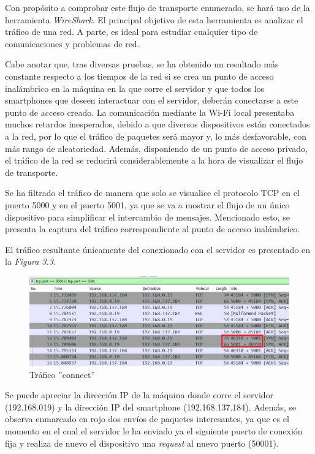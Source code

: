 \documentclass[a4paper,11pt]{book}
\begin{document}
			Con propósito a comprobar este flujo de transporte enumerado, se hará uso de la herramienta \textit{WireShark}. El principal objetivo de esta herramienta es analizar el tráfico de una red. A parte, es ideal para estudiar cualquier tipo de comunicaciones y problemas de red.
			
			Cabe anotar que, tras diversas pruebas, se ha obtenido un resultado más constante respecto a los tiempos de la red si se crea un punto de acceso inalámbrico en la máquina en la que corre el servidor y que todos los smartphones que deseen interactuar con el servidor, deberán conectarse a este punto de acceso creado. La comunicación mediante la Wi-Fi local presentaba muchos retardos inesperados, debido a que diversos dispositivos están conectados a la red, por lo que el tráfico de paquetes será mayor y, lo más desfavorable, con más rango de aleatoriedad.
			Además, disponiendo de un punto de acceso privado, el tráfico de la red se reducirá considerablemente a la hora de visualizar el flujo de transporte.
			
			Se ha filtrado el tráfico de manera que solo se visualice el protocolo TCP en el puerto 5000 y en el puerto 5001, ya que se va a mostrar el flujo de un único dispositivo  para simplificar el intercambio de mensajes. Mencionado esto, se presenta la captura del tráfico correspondiente al punto de acceso inalámbrico. 
			
			El tráfico resultante únicamente del conexionado con el servidor es presentado en la \textit{Figura 3.3}.
			
\begin{figure}[hbtp]
\centering
\includegraphics[width = 15cm]{FIGURAS/trafico_connect.png}
\caption{Tráfico ''connect''}
\end{figure}

Se puede apreciar la dirección IP de la máquina donde corre el servidor (192.168.019) y la dirección IP del smartphone (192.168.137.184). Además, se observa enmarcado en rojo dos envíos de paquetes interesantes, ya que es el momento en el cual el servidor le ha enviado ya el siguiente puerto de conexión fija y realiza de nuevo el dispositivo una \textit{request} al nuevo puerto (50001).
\end{document}
